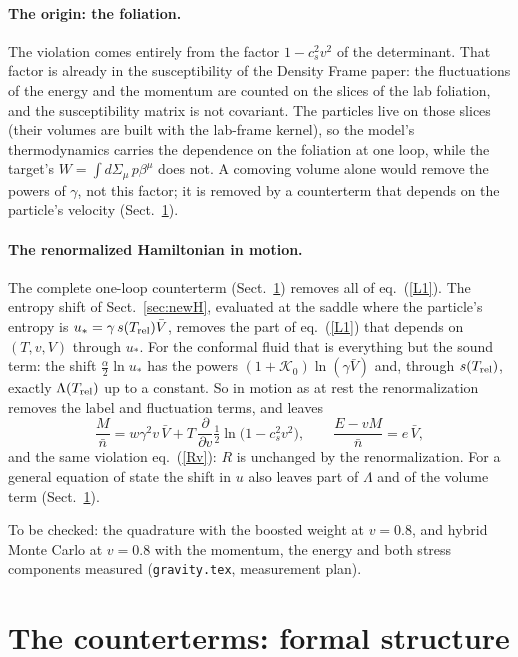 \documentclass[11pt,aps,preprint,nofootinbib,superscriptaddress,tightenlines]{revtex4-2}
\def\st{\begin{equation}}
\def\stp{\end{equation}}
\def\Eq#1{eq.~(\ref{#1})}
\def\Sect#1{Sect.~\ref{#1}}
\let\oldparagraph\paragraph
\renewcommand{\paragraph}{\par\bigskip\oldparagraph}
\begin{document}
\paragraph{The origin: the foliation.}  The violation comes entirely from the factor $1-c_s^2v^2$ of the determinant.  That factor is already in the
susceptibility of the Density Frame paper: the fluctuations of the energy and the momentum are counted on the slices of the lab foliation, and the susceptibility
matrix is not covariant.  The particles live on those slices (their volumes are built with the lab-frame kernel), so the model's thermodynamics carries the
dependence on the foliation at one loop, while the target's $W=\int d\Sigma_\mu\,p\beta^\mu$ does not.  A comoving volume alone would remove the powers of $\gamma$, not
this factor; it is removed by a counterterm that depends on the particle's velocity (\Sect{sec:counterterms}).

\paragraph{The renormalized Hamiltonian in motion.}  The complete one-loop counterterm (\Sect{sec:counterterms}) removes all of \Eq{L1}.  The entropy shift of
\Sect{sec:newH}, evaluated at the saddle where the particle's entropy is $u_*=\gamma\,s(T_{\rm rel})\bar V$, removes the part of \Eq{L1} that depends on $(T,v,V)$ through $u_*$.
For the conformal fluid that is everything but the sound term: the shift $\tfrac\alpha2\ln u_*$ has the powers $(1+\mathcal K_0)\ln(\gamma\bar V)$ and, through $s(T_{\rm rel})$, exactly
$\Lambda(T_{\rm rel})$ up to a constant.  So in motion as at rest the renormalization removes the label and fluctuation terms, and leaves
\st
\frac{M}{\bar n}=w\gamma^2v\,\bar V+T\,\frac{\partial}{\partial v}\tfrac12\ln\big(1-c_s^2v^2\big),\qquad \frac{E-vM}{\bar n}=e\,\bar V ,
\stp
and the same violation \Eq{Rv}: $R$ is unchanged by the renormalization.  For a general equation of state the shift in $u$ also leaves part of $\Lambda$ and of the volume
term (\Sect{sec:counterterms}).

To be checked: the quadrature with the boosted weight at $v=0.8$, and hybrid Monte Carlo at $v=0.8$ with the momentum, the energy and both stress components measured
(\texttt{gravity.tex}, measurement plan).

\section{The counterterms: formal structure}
\label{sec:counterterms}
\end{document}
